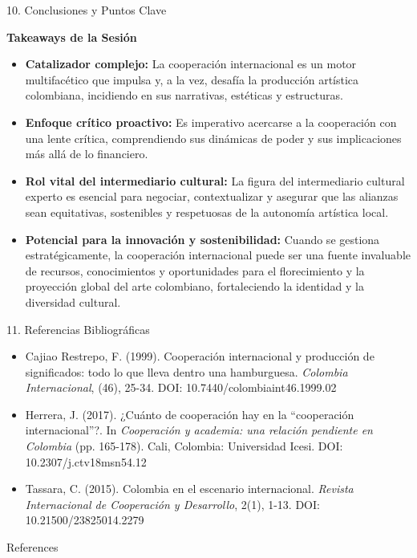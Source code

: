 \documentclass[aspectratio=169]{beamer}
\begin{document}
\begin{frame}[fragile]{10. Conclusiones y Puntos Clave}


\textbf{Takeaways de la Sesión}

\begin{itemize}
  \item \textbf{Catalizador complejo:} La cooperación internacional es un motor multifacético que impulsa y, a la vez, desafía la producción artística colombiana, incidiendo en sus narrativas, estéticas y estructuras.
  \item \textbf{Enfoque crítico proactivo:} Es imperativo acercarse a la cooperación con una lente crítica, comprendiendo sus dinámicas de poder y sus implicaciones más allá de lo financiero.
  \item \textbf{Rol vital del intermediario cultural:} La figura del intermediario cultural experto es esencial para negociar, contextualizar y asegurar que las alianzas sean equitativas, sostenibles y respetuosas de la autonomía artística local.
  \item \textbf{Potencial para la innovación y sostenibilidad:} Cuando se gestiona estratégicamente, la cooperación internacional puede ser una fuente invaluable de recursos, conocimientos y oportunidades para el florecimiento y la proyección global del arte colombiano, fortaleciendo la identidad y la diversidad cultural.
\end{itemize}
\end{frame}



\begin{frame}[fragile]{11. Referencias Bibliográficas}


\begin{itemize}
  \item Cajiao Restrepo, F. (1999). Cooperación internacional y producción de significados: todo lo que lleva dentro una hamburguesa. \textit{Colombia Internacional}, (46), 25-34. DOI: 10.7440/colombiaint46.1999.02
  \item Herrera, J. (2017). ¿Cuánto de cooperación hay en la “cooperación internacional”?. In \textit{Cooperación y academia: una relación pendiente en Colombia} (pp. 165-178). Cali, Colombia: Universidad Icesi. DOI: 10.2307/j.ctv18msn54.12
  \item Tassara, C. (2015). Colombia en el escenario internacional. \textit{Revista Internacional de Cooperación y Desarrollo}, 2(1), 1-13. DOI: 10.21500/23825014.2279
\end{itemize}
\end{frame}




\begin{frame}[allowframebreaks]{References}
  
  
\end{frame}
\end{document}
